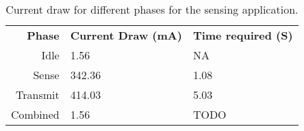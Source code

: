 \begin{table}[h]
        {\footnotesize
            \begin{tabularx}{\textwidth}{rll}

                \textbf{Phase} &
                \textbf{Current Draw (mA)} & \textbf{Time required (S)}\\ 

                Idle & 1.56 & NA\\ 
                Sense & 342.36 & 1.08\\
                Transmit & 414.03 & 5.03\\
                Combined & 1.56 & TODO\\


            \end{tabularx}
        }

        \vspace{-0.1in}

        \caption{Current draw for different phases for the sensing application.}

        \vspace{0.1in}
        \vspace{-0.2in}

    \label{table-currentdraw}
\end{table}
